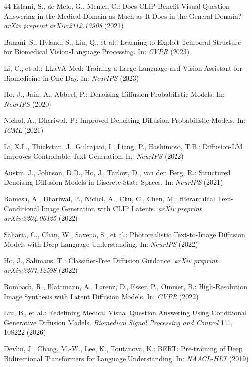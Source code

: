 \documentclass[9pt]{report}
\begin{document}
\begin{thebibliography}{44}
Eslami, S., de Melo, G., Meniel, C.: Does CLIP Benefit Visual Question Answering in the Medical Domain as Much as It Does in the General Domain? \textit{arXiv preprint arXiv:2112.13906} (2021)

Banani, S., Hyland, S., Liu, Q., et al.: Learning to Exploit Temporal Structure for Biomedical Vision-Language Processing. In: \textit{CVPR} (2023)

Li, C., et al.: LLaVA-Med: Training a Large Language and Vision Assistant for Biomedicine in One Day. In: \textit{NeurIPS} (2023)

Ho, J., Jain, A., Abbeel, P.: Denoising Diffusion Probabilistic Models. In: \textit{NeurIPS} (2020)

Nichol, A., Dhariwal, P.: Improved Denoising Diffusion Probabilistic Models. In: \textit{ICML} (2021)

Li, X.L., Thickstun, J., Gulrajani, I., Liang, P., Hashimoto, T.B.: Diffusion-LM Improves Controllable Text Generation. In: \textit{NeurIPS} (2022)

Austin, J., Johnson, D.D., Ho, J., Tarlow, D., van den Berg, R.: Structured Denoising Diffusion Models in Discrete State-Spaces. In: \textit{NeurIPS} (2021)

Ramesh, A., Dhariwal, P., Nichol, A., Chu, C., Chen, M.: Hierarchical Text-Conditional Image Generation with CLIP Latents. \textit{arXiv preprint arXiv:2204.06125} (2022)

Saharia, C., Chan, W., Saxena, S., et al.: Photorealistic Text-to-Image Diffusion Models with Deep Language Understanding. In: \textit{NeurIPS} (2022)

Ho, J., Salimans, T.: Classifier-Free Diffusion Guidance. \textit{arXiv preprint arXiv:2207.12598} (2022)

Rombach, R., Blattmann, A., Lorenz, D., Esser, P., Ommer, B.: High-Resolution Image Synthesis with Latent Diffusion Models. In: \textit{CVPR} (2022)

Liu, B., et al.: Redefining Medical Visual Question Answering Using Conditional Generative Diffusion Models. \textit{Biomedical Signal Processing and Control} 111, 108222 (2026)

Devlin, J., Chang, M.-W., Lee, K., Toutanova, K.: BERT: Pre-training of Deep Bidirectional Transformers for Language Understanding. In: \textit{NAACL-HLT} (2019)


\end{thebibliography}
\end{document}
